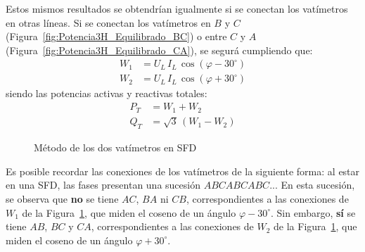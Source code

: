 Estos mismos resultados se obtendrían igualmente si se conectan los vatímetros en otras líneas. Si se conectan los vatímetros en $B$ y $C$ (Figura~\ref{fig:Potencia3H_Equilibrado_BC}) o entre $C$ y $A$ (Figura~\ref{fig:Potencia3H_Equilibrado_CA}), se segurá cumpliendo que: 
\begin{align*}
    W_1&=U_L\,I_L\,\cos(\varphi-30^\circ) \\
    W_2&=U_L\,I_L\,\cos(\varphi+30^\circ)
\end{align*}
siendo las potencias activas y reactivas totales: 
\begin{align*}
    P_T&=W_1 + W_2\\
    Q_T&=\sqrt{3}\,(W_1 - W_2)
\end{align*}
\begin{figure}[H]
    \centering{}\hfill
    \hfill
    \caption{Método de los dos vatímetros en SFD}
    \label{fig:potencia3H_equilibrado_SFD}
\end{figure}

\begin{remark}
    Es posible recordar las conexiones de los vatímetros de la siguiente forma: al estar en una SFD, las fases presentan una sucesión $ABCABCABC$... En esta sucesión, se observa que {\color{red}\textbf{no}} se tiene $AC$, $BA$ ni $CB$, correspondientes a las conexiones de $W_1$ de la Figura~\ref{fig:potencia3H_equilibrado_SFD}, que miden el coseno de un ángulo $\varphi-30^\circ$. Sin embargo, {\color{red}\textbf{sí}} se tiene $AB$, $BC$ y $CA$, correspondientes a las conexiones de $W_2$ de la Figura~\ref{fig:potencia3H_equilibrado_SFD}, que miden el coseno de un ángulo $\varphi+30^\circ$.
\end{remark}
  

